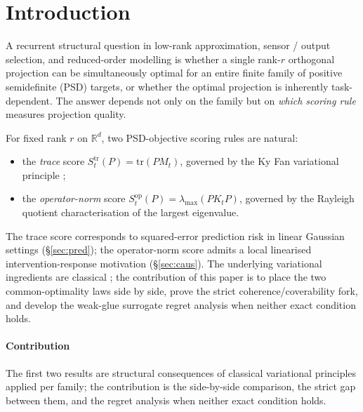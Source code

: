 \documentclass[final,3p,times]{elsarticle}
\newcommand{\tr}{\mathrm{tr}}
\newcommand{\R}{\mathbb{R}}
\begin{document}
\section{Introduction}

A recurrent structural question in low-rank approximation, sensor /
output selection, and reduced-order modelling is whether a single
rank-$r$ orthogonal projection can be simultaneously optimal for an
entire finite family of positive semidefinite (PSD) targets, or whether
the optimal projection is inherently task-dependent.
The answer depends not only on the family but on \emph{which scoring
rule} measures projection quality.

For fixed rank $r$ on $\R^d$, two PSD-objective scoring rules are
natural:
\begin{itemize}
\item the \emph{trace} score $S^{\mathrm{tr}}_t(P)=\tr(PM_t)$, governed
by the Ky Fan variational principle \cite{Fan1949};
\item the \emph{operator-norm} score $S^{\mathrm{op}}_t(P)
=\lambda_{\max}(PK_tP)$, governed by the Rayleigh quotient
characterisation of the largest eigenvalue.
\end{itemize}
The trace score corresponds to squared-error prediction risk in linear
Gaussian settings (\S\ref{sec:pred}); the operator-norm score admits a
local linearised intervention-response motivation (\S\ref{sec:caus}).
The underlying variational ingredients are classical
\cite{Fan1949,HornJohnson2013}; the contribution of this paper is to
place the two common-optimality laws side by side, prove the strict
coherence/coverability fork, and develop the weak-glue surrogate regret
analysis when neither exact condition holds.

\paragraph{Contribution}
The first two results are structural consequences of classical
variational principles applied per family; the contribution is the
side-by-side comparison, the strict gap between them, and the regret
analysis when neither exact condition holds.
\end{document}
